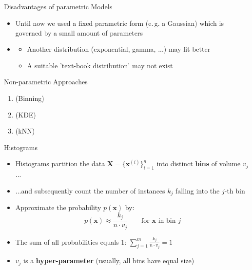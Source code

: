 \subsection{}

\begin{frame}{Disadvantages of parametric Models}{}
	\begin{itemize}
		\item Until now we used a fixed parametric form (e.\,g. a Gaussian) which is governed by a small amount of parameters
		\item {}
		\begin{itemize}
			\item Another distribution (exponential, gamma, ...) may fit better
			\item A suitable 'text-book distribution' may not exist
		\end{itemize}
	\end{itemize}
	
	\begin{boxBlueNoFrame}
	\end{boxBlueNoFrame}
\end{frame}


\begin{frame}{Non-parametric Approaches}{}
	\begin{enumerate}
		\item {} (Binning)
		\item {} (KDE)
		\item {} (kNN)
	\end{enumerate}
\end{frame}


\begin{frame}{Histograms}{}
	\begin{itemize}
		\item Histograms partition the data $\bm{X} = \{ \bm{x}^{(i)} \}_{i=1}^n$ into distinct \textbf{bins} of volume $v_j$...
		\item ...and subsequently count the number of instances $k_j$ falling into the $j$-th bin
		\item Approximate the probability $p(\bm{x})$ by:
		\begin{equation}
			p(\bm{x}) \approx \frac{k_j}{n \cdot v_j}\qquad \text{for $\bm{x}$ in bin $j$}
		\end{equation}
		\item The sum of all probabilities equals 1: $\sum_{j=1}^m \frac{k_j}{n \cdot v_j} = 1$
		\item $v_j$ is a \textbf{hyper-parameter} (usually, all bins have equal size) 
	\end{itemize}
\end{frame}



